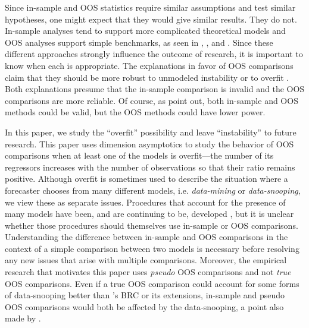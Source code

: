 \documentclass[11pt]{article}
\newcommand{\citepos}[1]{\citeauthor{#1}'s \citeyearpar{#1}}
\begin{document}
Since in-sample and OOS statistics require similar assumptions and
test similar hypotheses, one might expect that they would give similar
results.  They do not.  In-sample analyses tend to support more
complicated theoretical models and OOS analyses support simple
benchmarks, as seen in \citet{MeR:83}, \citet{StW:03}, and
\citet{GoW:08}.  Since these different approaches strongly influence
the outcome of research, it is important to know when each is
appropriate.  The explanations in favor of OOS comparisons claim
that they should be more robust to unmodeled instability
\citep{ClM:05,GiW:06,GiR:09,GiR:10} or to overfit
\citep{Mcc:98,Cla:04}.  Both explanations presume that the in-sample
comparison is invalid and the OOS comparisons are more reliable.  Of
course, as \citet{InK:04,InK:06} point out, both in-sample and OOS
methods could be valid, but the OOS methods could have lower power.

In this paper, we study the ``overfit'' possibility and leave
``instability'' to future research. This paper uses dimension
asymptotics to study the behavior of OOS comparisons when at least
one of the models is overfit---the number of its regressors
increases with the number of observations so that their ratio remains
positive.  Although overfit is sometimes used to describe the
situation where a forecaster chooses from many different models,
i.e. \textit{data-mining} or \textit{data-snooping}, we view these as
separate issues.  Procedures that account for the presence of many
models have been, and are continuing to be, developed \citep[see, for
example,][]{Whi:00,Han:05,RoW:05,HHK:10,ClM:12b}, but it is unclear
whether those procedures should themselves use in-sample or OOS
comparisons.  Understanding the difference between in-sample and OOS
comparisons in the context of a simple comparison between two models
is necessary before resolving any new issues that arise with multiple
comparisons. Moreover, the empirical research that motivates
this paper uses \textit{pseudo} OOS comparisons and not
\textit{true} OOS comparisons.  Even if a true OOS comparison
could account for some forms of data-snooping better than
\citepos{Whi:00} BRC or its extensions, in-sample and pseudo
OOS comparisons would both be affected by the data-snooping, a
point also made by \citet{InK:04}.
\end{document}
